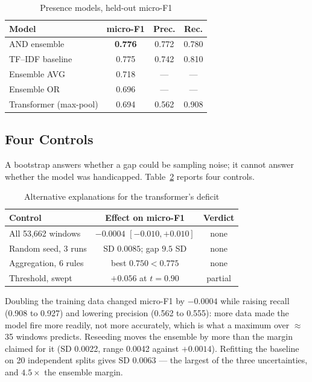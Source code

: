 \documentclass[journal,a4paper]{IEEEtran}
\begin{document}
\begin{table}[!t]
\caption{Presence models, held-out micro-F1}
\label{tab:presence}
\centering
\begin{tabular}{lccc}
\toprule
\textbf{Model} & \textbf{micro-F1} & \textbf{Prec.} & \textbf{Rec.}\\
\midrule
AND ensemble          & \textbf{0.776} & 0.772 & 0.780\\
TF--IDF baseline      & 0.775 & 0.742 & 0.810\\
Ensemble AVG          & 0.718 & --- & ---\\
Ensemble OR           & 0.696 & --- & ---\\
Transformer (max-pool)& 0.694 & 0.562 & 0.908\\
\bottomrule
\end{tabular}
\end{table}

\subsection{Four Controls}
\label{sec:controls}
A bootstrap answers whether a gap could be sampling noise; it cannot answer whether the model
was handicapped. Table~\ref{tab:controls} reports four controls.

\begin{table}[!t]
\caption{Alternative explanations for the transformer's deficit}
\label{tab:controls}
\centering
\small
\setlength{\tabcolsep}{4pt}
\begin{tabular}{lcc}
\toprule
\textbf{Control} & \textbf{Effect on micro-F1} & \textbf{Verdict}\\
\midrule
All 53{,}662 windows      & $-0.0004$ $[-0.010,+0.010]$ & none\\
Random seed, 3 runs       & SD $0.0085$; gap $9.5$ SD   & none\\
Aggregation, 6 rules      & best $0.750 < 0.775$        & none\\
Threshold, swept          & $+0.056$ at $t{=}0.90$      & partial\\
\bottomrule
\end{tabular}
\end{table}

Doubling the training data changed micro-F1 by $-0.0004$ while raising recall (0.908 to 0.927)
and lowering precision (0.562 to 0.555): more data made the model fire more readily, not more
accurately, which is what a maximum over $\approx$35 windows predicts. Reseeding moves the
ensemble by more than the margin claimed for it (SD 0.0022, range 0.0042 against $+0.0014$).
Refitting the baseline on 20 independent splits gives SD 0.0063 --- the largest of the three
uncertainties, and $4.5\times$ the ensemble margin.
\end{document}

